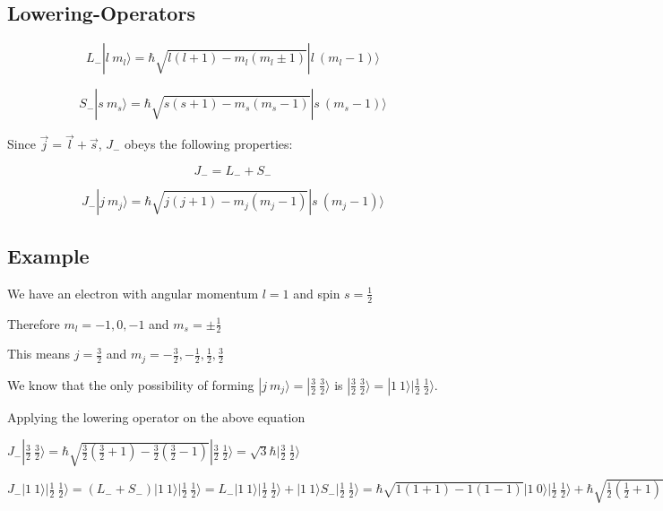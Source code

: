 \documentclass[
paper=128mm:96mm, %
fontsize=11pt, %
pagesize, %
parskip=half-, %
]{scrartcl} %
\theoremstyle{mythmstyle} %
\begin{document}
\subsection{Lowering-Operators}

\begin{equation}
L_{-} |l\ m_l \rangle = \hbar \sqrt{l(l+1)-m_l(m_l \pm 1)} |l\ (m_l - 1) \rangle
\label{l}
\end{equation}

\begin{equation}
S_{-} |s\ m_s \rangle = \hbar \sqrt{s(s+1)-m_s(m_s - 1)} |s\ (m_s - 1) \rangle
\label{s}
\end{equation}

Since $\vec{j}= \vec{l}+ \vec{s}$, $J_{-}$ obeys the following properties:

\begin{equation}
J_{-}= L_{-} + S_{-}
\label{jsum}
\end{equation}

\begin{equation}
J_{-} |j\ m_j \rangle = \hbar \sqrt{j(j+1)-m_j(m_j - 1)} |s\ (m_j  - 1) \rangle
\label{j}
\end{equation}

\clearpage

\subsection{Example}

We have an electron with angular momentum $l=1$ and spin $s=\frac{1}{2}$

Therefore $m_l=-1,0,-1$ and $m_s= \pm \frac{1}{2}$

This means $j=\frac{3}{2}$ and $m_j= -\frac{3}{2}, - \frac{1}{2}, \frac{1}{2}, \frac{3}{2}$

We know that the only possibility of forming $|j\ m_j\rangle= |\frac{3}{2}\ \frac{3}{2}\rangle$ is $|\frac{3}{2}\ \frac{3}{2}\rangle = |1\ 1\rangle |\frac{1}{2}\ \frac{1}{2}\rangle $.

Applying the lowering operator on the above equation

$J_{-}|\frac{3}{2}\ \frac{3}{2}\rangle =  \hbar \sqrt{\frac{3}{2} \left( \frac{3}{2}+1 \right) -  \frac{3}{2} \left( \frac{3}{2}-1 \right)} |\frac{3}{2}\ \frac{1}{2}\rangle = \sqrt{3} \hbar |\frac{3}{2}\ \frac{1}{2}\rangle$

$J_{-} |1\ 1\rangle |\frac{1}{2}\ \frac{1}{2}\rangle = (L_{-}+ S_{-}) |1\ 1\rangle |\frac{1}{2}\ \frac{1}{2}\rangle= L_{-}|1\ 1\rangle |\frac{1}{2}\ \frac{1}{2}\rangle + |1\ 1\rangle S_{-} |\frac{1}{2}\ \frac{1}{2}\rangle = \hbar\sqrt{1(1+1)-1(1-1)} |1\ 0\rangle |\frac{1}{2}\ \frac{1}{2}\rangle + \hbar \sqrt{\frac{1}{2} \left( \frac{1}{2}+1 \right) -  \frac{1}{2} \left( \frac{1}{2}-1 \right)} |1\ 1\rangle |\frac{1}{2}\ -\frac{1}{2}\rangle = \hbar \sqrt{2} |1\ 0\rangle |\frac{1}{2}\ \frac{1}{2}\rangle + \hbar |1\ 1\rangle |\frac{1}{2}\ -\frac{1}{2}\rangle$
\end{document}
